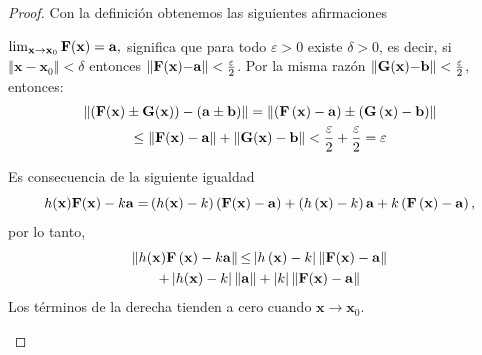 \begin{proof}
  Con la definición obtenemos las siguientes afirmaciones
  \begin{parrafonumerado}
  \item $\lim_{\mathbf{x\to x}_{0}}\mathbf{F}(\mathbf{x}) =\mathbf{a,}$
    significa que para todo $\varepsilon >0$ existe $\delta >0$,
    es decir, si $\left\Vert \mathbf{x-x}_{0}\right\Vert <\delta $ entonces
    $\left\Vert \mathbf{F}(\mathbf{x}) \mathbf{-a}\right\Vert <\frac{\varepsilon }{2}$.
    Por la misma razón
    $\left\Vert \mathbf{G}(\mathbf{x}) \mathbf{-b}\right\Vert <\frac{\varepsilon }{2}$,
    entonces:
    \begin{multline*}
      \left\Vert \left( \mathbf{F}(\mathbf{x}) \pm \mathbf{G}(\mathbf{x}) \right) -\left( \mathbf{a\pm b}
      \right) \right\Vert = \left\Vert \left( \mathbf{F}\left( \mathbf{x} \right) -\mathbf{a}\right) \pm \left( \mathbf{G}\left( \mathbf{x} \right) -\mathbf{b}\right) \right\Vert \\
      \leq \left\Vert \mathbf{F} (\mathbf{x}) -\mathbf{a}\right\Vert +\left\Vert \mathbf{G}(\mathbf{x}) -\mathbf{b}\right\Vert <\frac{\varepsilon }{2}+\frac{\varepsilon }{2}= \varepsilon
    \end{multline*}

  \item Es consecuencia de la siguiente igualdad
    $$h(\mathbf{x}) \ve{F}(\mathbf{x}) -k \mathbf{a=}\left( h(\mathbf{x}) -k\right) \left( \ve{%
    F}(\mathbf{x}) -\mathbf{a}\right) +\left( h\left( \mathbf{x} \right) -k\right) \mathbf{a}+k\left( \ve{F}\left( \mathbf{x} \right) -\mathbf{a}\right),$$
    por lo tanto,
    \begin{multline*}
      \left\Vert h(\mathbf{x}) \mathbf{F}\left( \mathbf{x}\right) -k\mathbf{a}\right\Vert \mathbf{\leq }\left\vert h\left( \mathbf{x} \right) -k\right\vert \left\Vert \mathbf{F}(\mathbf{x}) - \mathbf{a}\right\Vert \\ +\left\vert h(\mathbf{x}) -k\right\vert \left\Vert \mathbf{a}\right\Vert +\left\vert k\right\vert \left\Vert \mathbf{F}(\mathbf{x}) -\mathbf{a}\right\Vert
    \end{multline*}
    Los términos de la derecha tienden a cero cuando $\mathbf{x}\to \mathbf{x}_{0}$.


\end{parrafonumerado}
\end{proof}
